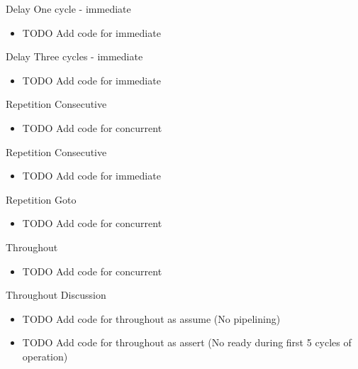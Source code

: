 \documentclass{beamer}
\begin{document}
\begin{frame}{Delay}
One cycle - immediate

\begin{itemize}
 \item TODO Add code for immediate
\end{itemize}
\end{frame}


\begin{frame}{Delay}
Three cycles - immediate

\begin{itemize}
 \item TODO Add code for immediate
\end{itemize}
\end{frame}


\begin{frame}{Repetition}
Consecutive

\begin{itemize}
 \item TODO Add code for concurrent
\end{itemize}
\end{frame}


\begin{frame}{Repetition}
Consecutive

\begin{itemize}
 \item TODO Add code for immediate
\end{itemize}
\end{frame}


\begin{frame}{Repetition}
Goto

\begin{itemize}
 \item TODO Add code for concurrent
\end{itemize}
\end{frame}


\begin{frame}{Throughout}
\begin{itemize}
 \item TODO Add code for concurrent
\end{itemize}
\end{frame}


\begin{frame}{Throughout}
Discussion
\begin{itemize}
 \item TODO Add code for throughout as assume (No pipelining)
 \item TODO Add code for throughout as assert (No ready during first 5 cycles of operation)
\end{itemize}
\end{frame}
\end{document}
